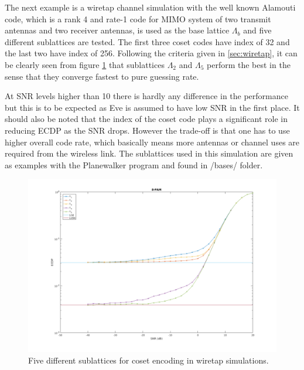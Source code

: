 \documentclass[english,12pt,a4paper,pdftex,sci,utf8]{aaltothesis}
\begin{document}
The next example is a wiretap channel simulation with the well known Alamouti code, which is a rank 4 and rate-1 code for MIMO system of two transmit antennas and two receiver antennas, is used as the base lattice $\Lambda_b$ and five different sublattices are tested. The first three coset codes have index of 32 and the last two have index of 256. Following the criteria given in \ref{sec:wiretap}, it can be clearly seen from figure \ref{fig:ecdp} that sublattices $\Lambda_2$ and $\Lambda_5$ perform the best in the sense that they converge fastest to pure guessing rate. 
\par At SNR levels higher than 10 there is hardly any difference in the performance but this is to be expected as Eve is assumed to have low SNR in the first place. It should also be noted that the index of the coset code plays a significant role in reducing ECDP as the SNR drops. However the trade-off is that one has to use higher overall code rate, which basically means more antennas or channel uses are required from the wireless link. The sublattices used in this simulation are given as examples with the Planewalker program and found in /bases/ folder.
\begin{figure}[htb]
  \centering
  \includegraphics[width=\linewidth]{alamouti_cosets12345_8-PAM}
  \caption{Five different sublattices for coset encoding in wiretap simulations.}
  \label{fig:ecdp}
\end{figure}


\clearpage
\end{document}
